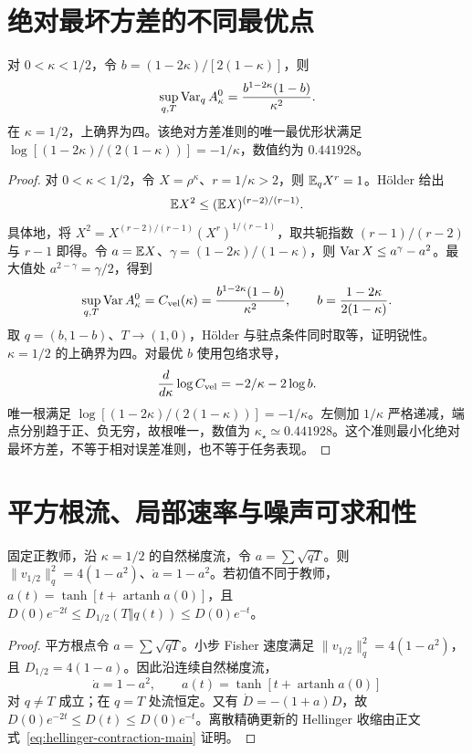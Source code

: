 \section{绝对最坏方差的不同最优点}
\begin{theorem}[绝对最坏小步方差及其最优形状]
对 $0<\kappa<1/2$，令 $b=(1-2\kappa)/[2(1-\kappa)]$，则
\begin{equation}
\sup_{q,T}\operatorname{Var}_q A_\kappa^0
=\frac{b^{1-2\kappa}(1-b)}{\kappa^2}.
\end{equation}
在 $\kappa=1/2$，上确界为四。该绝对方差准则的唯一最优形状满足
$\log[(1-2\kappa)/(2(1-\kappa))]=-1/\kappa$，数值约为 $0.441928$。
\end{theorem}
\begin{proof}
对 $0<\kappa<1/2$，令 $X=\rho^\kappa$、$r=1/\kappa>2$，则 $\mathbb E_qX^r=1$。Hölder 给出
\begin{equation}
\mathbb E X^2\le(\mathbb E X)^{(r-2)/(r-1)}.
\end{equation}
具体地，将 $X^2=X^{(r-2)/(r-1)}(X^r)^{1/(r-1)}$，取共轭指数 $(r-1)/(r-2)$ 与 $r-1$ 即得。令 $a=\mathbb E X$、$\gamma=(1-2\kappa)/(1-\kappa)$，则 $\operatorname{Var} X\le a^\gamma-a^2$。最大值处 $a^{2-\gamma}=\gamma/2$，得到
\begin{equation}
\sup_{q,T}\operatorname{Var} A^0_\kappa
=C_{\rm vel}(\kappa)
=\frac{b^{1-2\kappa}(1-b)}{\kappa^2},
\qquad b=\frac{1-2\kappa}{2(1-\kappa)}.
\end{equation}
取 $q=(b,1-b)$、$T\to(1,0)$，Hölder 与驻点条件同时取等，证明锐性。$\kappa=1/2$ 的上确界为四。对最优 $b$ 使用包络求导，
\begin{equation}
\frac d{d\kappa}\log C_{\rm vel}=-2/\kappa-2\log b.
\end{equation}
唯一根满足 $\log[(1-2\kappa)/(2(1-\kappa))]=-1/\kappa$。左侧加 $1/\kappa$ 严格递减，端点分别趋于正、负无穷，故根唯一，数值为 $\kappa_\star\simeq0.441928$。这个准则最小化绝对最坏方差，不等于相对误差准则，也不等于任务表现。
\end{proof}

\section{平方根流、局部速率与噪声可求和性}
\begin{proposition}[平方根自然梯度流的显式亲和度]
固定正教师，沿 $\kappa=1/2$ 的自然梯度流，令 $a=\sum\sqrt{qT}$。则 $\|v_{1/2}\|_q^2=4(1-a^2)$、$\dot a=1-a^2$。若初值不同于教师，
$a(t)=\tanh[t+\operatorname{artanh}a(0)]$，且 $D(0)e^{-2t}\le D_{1/2}(T\Vert q(t))\le D(0)e^{-t}$。
\end{proposition}
\begin{proof}
平方根点令 $a=\sum\sqrt{qT}$。小步 Fisher 速度满足 $\|v_{1/2}\|_q^2=4(1-a^2)$，且 $D_{1/2}=4(1-a)$。因此沿连续自然梯度流，
\begin{equation}
\dot a=1-a^2,\qquad a(t)=\tanh[t+\operatorname{artanh}a(0)]
\end{equation}
对 $q\ne T$ 成立；在 $q=T$ 处流恒定。又有 $\dot D=-(1+a)D$，故 $D(0)e^{-2t}\le D(t)\le D(0)e^{-t}$。离散精确更新的 Hellinger 收缩由正文式~\eqref{eq:hellinger-contraction-main} 证明。
\end{proof}


